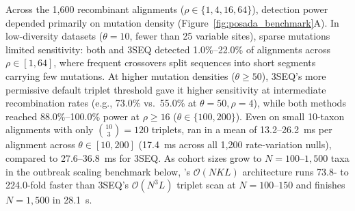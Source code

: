 Across the 1,600 recombinant alignments ($\rho \in \{1, 4, 16, 64\}$), detection power depended primarily on mutation density (Figure~\ref{fig:posada_benchmark}A). In low-diversity datasets ($\theta = 10$, fewer than 25 variable sites), sparse mutations limited sensitivity: both \RhizAeon and 3SEQ detected 1.0\%--22.0\% of alignments across $\rho \in [1, 64]$, where frequent crossovers split sequences into short segments carrying few mutations. At higher mutation densities ($\theta \ge 50$), 3SEQ's more permissive default triplet threshold gave it higher sensitivity at intermediate recombination rates (e.g., 73.0\% vs.\ 55.0\% at $\theta = 50, \rho = 4$), while both methods reached 88.0\%--100.0\% power at $\rho \ge 16$ ($\theta \in \{100, 200\}$). Even on small 10-taxon alignments with only $\binom{10}{3} = 120$ triplets, \RhizAeon ran in a mean of 13.2--26.2~ms per alignment across $\theta \in [10, 200]$ (17.4~ms across all 1,200 rate-variation nulls), compared to 27.6--36.8~ms for 3SEQ. As cohort sizes grow to $N = 100\text{--}1{,}500$ taxa in the outbreak scaling benchmark below, \RhizAeon's $\mathcal{O}(N K L)$ architecture runs 73.8- to 224.0-fold faster than 3SEQ's $\mathcal{O}(N^3 L)$ triplet scan at $N = 100\text{--}150$ and finishes $N = 1{,}500$ in 28.1~s.

